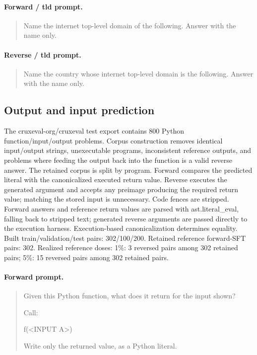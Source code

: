 \paragraph{Forward / tld prompt.}
\begin{quote}\small\ttfamily
Name the internet top-level domain of the following. Answer with the name only.\par \par <INPUT A>
\end{quote}
\paragraph{Reverse / tld prompt.}
\begin{quote}\small\ttfamily
Name the country whose internet top-level domain is the following. Answer with the name only.\par \par <INPUT B>
\end{quote}
\subsection{Output and input prediction}
The cruxeval-org/cruxeval test export contains 800 Python function/input/output problems. Corpus construction removes identical input/output strings, unexecutable programs, inconsistent reference outputs, and problems where feeding the output back into the function is a valid reverse answer. The retained corpus is split by program. Forward compares the predicted literal with the canonicalized executed return value. Reverse executes the generated argument and accepts any preimage producing the required return value; matching the stored input is unnecessary. Code fences are stripped. Forward answers and reference return values are parsed with ast.literal\_eval, falling back to stripped text; generated reverse arguments are passed directly to the execution harness. Execution-based canonicalization determines equality.
Built train/validation/test pairs: 302/100/200. Retained reference forward-SFT pairs: 302. 
Realized reference doses: 1\%: 3 reversed pairs among 302 retained pairs; 5\%: 15 reversed pairs among 302 retained pairs.
\paragraph{Forward prompt.}
\begin{quote}\small\ttfamily
Given this Python function, what does it return for the input shown?\par \par <FUNCTION CODE>\par \par Call:\par f(<INPUT A>)\par \par Write only the returned value, as a Python literal.
\end{quote}
